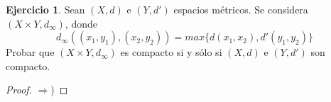 \documentclass[12pt]{article}
\newcommand{\Ra}{\Rightarrow}
\theoremstyle{definition}
\newtheorem{ej}{Ejercicio}
\begin{document}
\begin{ej}
	Sean $(X,d)$ e $(Y,d')$ espacios métricos. Se considera $(X \times Y , d_{\infty})$, donde
	$$ d_{\infty}((x_1,y_1),(x_2,y_2)) = max \{d(x_1,x_2),d'(y_1,y_2)\} $$
Probar que $(X\times Y,d_{\infty})$ es compacto si y sólo si $(X,d)$ e $(Y,d')$ son compacto.

\begin{proof}
	$\Ra$) 
\end{proof}
\end{ej}
\end{document}
